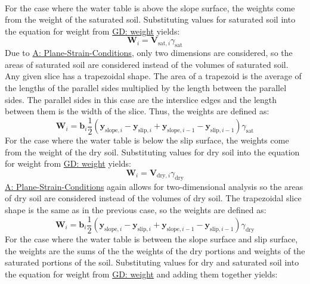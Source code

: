 \documentclass[12pt]{article}
\begin{document}
\paragraph{}
\label{GD:sliceWghtDeriv}
For the case where the water table is above the slope surface, the weights come from the weight of the saturated soil. Substituting values for saturated soil into the equation for weight from \hyperref[GD:weight]{GD: weight} yields:
\begin{displaymath}
{\mathbf{W}}_{i}={\mathbf{V}_{\text{sat},i}} {γ_{\text{sat}}}
\end{displaymath}
Due to \hyperref[assumpPSC]{A: Plane-Strain-Conditions}, only two dimensions are considered, so the areas of saturated soil are considered instead of the volumes of saturated soil. Any given slice has a trapezoidal shape. The area of a trapezoid is the average of the lengths of the parallel sides multiplied by the length between the parallel sides. The parallel sides in this case are the interslice edges and the length between them is the width of the slice. Thus, the weights are defined as:
\begin{displaymath}
{\mathbf{W}}_{i}={\mathbf{b}}_{i} \frac{1}{2} \left({\mathbf{y}_{\text{slope},i}}-{\mathbf{y}_{\text{slip},i}}+{\mathbf{y}_{\text{slope},i-1}}-{\mathbf{y}_{\text{slip},i-1}}\right) {γ_{\text{sat}}}
\end{displaymath}
For the case where the water table is below the slip surface, the weights come from the weight of the dry soil. Substituting values for dry soil into the equation for weight from \hyperref[GD:weight]{GD: weight} yields:
\begin{displaymath}
{\mathbf{W}}_{i}={\mathbf{V}_{\text{dry},i}} {γ_{\text{dry}}}
\end{displaymath}
\hyperref[assumpPSC]{A: Plane-Strain-Conditions} again allows for two-dimensional analysis so the areas of dry soil are considered instead of the volumes of dry soil. The trapezoidal slice shape is the same as in the previous case, so the weights are defined as:
\begin{displaymath}
{\mathbf{W}}_{i}={\mathbf{b}}_{i} \frac{1}{2} \left({\mathbf{y}_{\text{slope},i}}-{\mathbf{y}_{\text{slip},i}}+{\mathbf{y}_{\text{slope},i-1}}-{\mathbf{y}_{\text{slip},i-1}}\right) {γ_{\text{dry}}}
\end{displaymath}
For the case where the water table is between the slope surface and slip surface, the weights are the sums of the the weights of the dry portions and weights of the saturated portions of the soil. Substituting values for dry and saturated soil into the equation for weight from \hyperref[GD:weight]{GD: weight} and adding them together yields:
\end{document}

